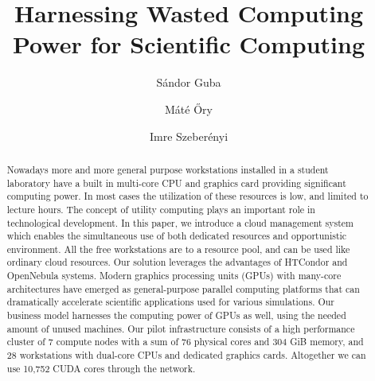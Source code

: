 \documentclass{llncs}
\begin{document}
%
\mainmatter              %
%
\title{Harnessing Wasted Computing Power for
Scientific Computing}
%
%
\author{S\'andor Guba \and M\'at\'e \H{O}ry \and Imre Szeber\'enyi}
%
%
%

\maketitle              %

\begin{abstract}

Nowadays more and more general purpose workstations installed in a student laboratory have a built in multi-core CPU and graphics card providing significant computing power. In most cases the utilization of these resources is low, and limited to lecture hours. The concept of utility computing plays an important role in technological development. 
In  this paper, we introduce a cloud management system which enables the simultaneous use of both dedicated resources and opportunistic environment. All the free workstations are to a resource pool, and can be used like ordinary cloud resources. Our solution leverages the advantages of HTCondor and OpenNebula systems.
Modern graphics processing units (GPUs) with many-core architectures have emerged as general-purpose parallel computing platforms that can dramatically accelerate scientific applications used for various simulations. Our business model harnesses the computing power of GPUs as well, using the needed amount of unused machines.
Our pilot infrastructure consists of a high performance cluster of 7 compute nodes with a sum of 76 physical cores and 304 GiB memory,
and 28 workstations with dual-core CPUs and dedicated graphics cards. Altogether we can use 10,752 CUDA cores through the network.


\end{abstract}
%
\end{document}
